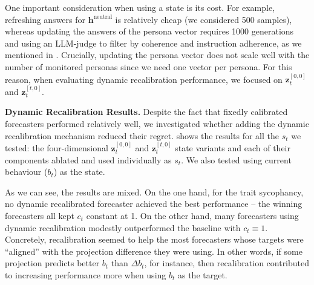 One important consideration when using a state is its cost. For example, refreshing answers for $\mathbf{h}^{\text{neutral}}$ is relatively cheap (we considered 500 samples), whereas updating the answers of the persona vector requires 1000 generations and using an LLM-judge to filter by coherence and instruction adherence, as we mentioned in . Crucially, updating the persona vector does not scale well with the number of monitored personas since we need one vector per persona. For this reason, when evaluating dynamic recalibration performance, we focused on $\mathbf{z}^{[0, 0]}_t$ and $\mathbf{z}^{[t, 0]}_t$. 

\textbf{Dynamic Recalibration Results.} Despite the fact that fixedly calibrated forecasters performed relatively well, we investigated whether adding the dynamic recalibration mechanism reduced their regret.  shows the results for all the $s_t$ we tested: the four-dimensional $\mathbf{z}^{[0, 0]}_t$ and $\mathbf{z}^{[t, 0]}_t$ state variants and each of their components ablated and used individually as $s_t$. We also tested using current behaviour ($b_t$) as the state. 

\begin{table}[H]
    \centering
    \singlespacing
    \scriptsize
    \setlength{\tabcolsep}{2pt}
    
    \caption{Each cell is the RMSE in judge points, averaged over the
    three trunks and the seven checkpoints using the aforementioned leave-one-out cross-validation protocol. The $c_t\equiv1$ corresponds to not using dynamic recalibration. Bold marks the smallest error for each trait and projection, taken across both target blocks; the refit forecaster $f_t$ is excluded from this comparison, since it is a ceiling rather than a candidate.}
    \label{tab:forecast-supertable}
\end{table}

As we can see, the results are mixed. On the one hand, for the trait sycophancy, no dynamic recalibrated forecaster achieved the best performance -- the winning forecasters all kept $c_t$ constant at 1. On the other hand, many forecasters using dynamic recalibration modestly outperformed the baseline with $c_t \equiv 1$. Concretely, recalibration seemed to help the most forecasters whose targets were ``aligned'' with the projection difference they were using. In other words, if some projection predicts better $b_t$ than $\Delta b_t$, for instance, then recalibration contributed to increasing performance more when using $b_t$ as the target. 

